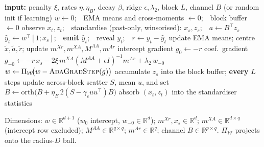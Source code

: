 \documentclass[11pt]{article}
\theoremstyle{plain}
\theoremstyle{remark}
\newcommand{\R}{\mathbb{R}}
\newcommand{\OARF}{\textsc{OARF}}
\begin{document}
\begin{algorithm}[t]
\caption{\OARF{} with online channel discovery (one streaming pass)}
\label{alg:oarf}
\begin{algorithmic}[1]
\State \textbf{input:} penalty $\xi$, rates $\eta,\eta_B$, decay $\beta$, ridge
$\epsilon,\lambda_2$, block $L$, channel $B$ (or random init if learning)
\State $w\gets 0$;\ \ EMA means and cross-moments $\gets 0$;\ \ block buffer $\gets 0$
  \State observe $x_t,z_t$;\ \ standardise (past-only, winsorised): $x_s,z_s$;\ \ $a\gets B^\top z_s$
  \State $\hat y_t\gets w^\top[1;x_s]$;\ \ \textbf{emit} $\hat y_t$;\ \ reveal $y_t$;\ \ $r\gets y_t-\hat y_t$
  \State update EMA means; centre $\tilde x,\tilde a,\tilde r$; update $m^{Xr},m^{XA},M^{AA},m^{Ar}$
  \State intercept gradient $g_0\gets -r$
  \State coef.\ gradient $g_{-0}\gets -r\,x_s-2\xi\,m^{XA}(M^{AA}+\epsilon I)^{-1}m^{Ar}+\lambda_2\,w_{-0}$
  \State $w\gets \Pi_{\mathcal{W}}\!\big(w-\textsc{AdaGradStep}(g)\big)$ 
     \State accumulate $z_s$ into the block buffer; \textbf{every} $L$ steps update
     across-block scatter $S$, mean $u$, and set $B\gets \mathrm{orth}\big(B+\eta_B\,2(S-\gamma_c uu^\top)B\big)$
  \EndIf
  \State absorb $(x_t,z_t)$ into the standardiser statistics
\EndFor
\end{algorithmic}
{\footnotesize Dimensions: $w\in\R^{d+1}$ ($w_0$ intercept, $w_{-0}\in\R^d$);
$m^{Xr},x_s\in\R^{d}$; $m^{XA}\in\R^{d\times q}$ (intercept row excluded);
$M^{AA}\in\R^{q\times q}$; $m^{Ar}\in\R^{q}$; channel $B\in\R^{p\times q}$.
$\Pi_{\mathcal{W}}$ projects onto the radius-$D$ ball.}
\end{algorithm}
\end{document}

